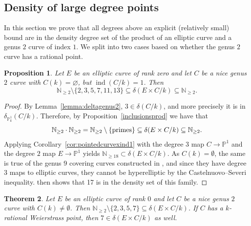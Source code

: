 \documentclass[a4paper,11pt]{amsart}
\theoremstyle{plain}
\newtheorem{thm}{Theorem}[section]
\newtheorem{prop}[thm]{Proposition}
\theoremstyle{remark}
\newcommand{\nn}{\mathbb{N}}
\newcommand{\pp}{\mathbb{P}}
\newcommand{\dendegs}{\delta}
\newcommand{\ind}{\operatorname{ind}}
\begin{document}
\subsection{Density of large degree points}

In this section we prove that all degrees above an explicit (relatively small) bound are in the density degree set of the product of an elliptic curve and a genus \(2\) curve of index \(1\).  We split into two cases based on whether the genus \(2\) curve has a rational point.

\begin{prop}\label{prop:index1genus2andE}
    Let $E$ be an elliptic curve of rank zero and let \(C\) be a nice genus \(2\) curve with $C(k)=\varnothing$, but $\ind(C/k)=1$. 
    Then
    \[
    \nn_{\geq 2}\setminus \{2,3,5,7,11,13\} \subseteq  \dendegs(E\times C/k)\subseteq \nn_{\geq 2}.
    \]
\end{prop}

\begin{proof}
By Lemma~\ref{lemma:deltagenus2}, $3\in \dendegs(C/k)$, and more precisely it is in $\delta_{\mathbb{P}^1_k}(C/k)$.
 Therefore, by Proposition~\ref{inclusionsprod} we have that
    \[
        \nn_{\geq 2} \cdot  \nn_{\geq 2} = \nn_{\geq 2} \setminus \{ \textup{primes} \} \subseteq \dendegs(E\times C/k)\subseteq \mathbb{N}_{\geq 2}.
    \]  
    Applying  Corollary~\ref{cor:pointedcurvexind1} with the degree \(3\) map \(C \to \pp^1\) and the degree \(2\) map \(E \to \pp^1\) yields $\nn_{\geq 18}\subset \dendegs(E\times C/k)$. 
    As $C(k) = \emptyset$, the same is true of the genus 9 covering curves constructed in , and since they have degree 3 maps to elliptic curves, they cannot be hyperelliptic by the Castelnuovo--Severi inequality.  then shows that 17 is in the density set of this family.
\end{proof}



\begin{thm}\label{thm:nngeq9indeltaCxE}
    Let \(E\) be an elliptic curve of rank \(0\) and let \(C\) be a nice genus \(2\) curve with \(C(k) \neq \emptyset\).
    Then $\nn_{\geq 2}\setminus \{2,3,5,7\} \subseteq \dendegs(E\times C/k)$.
    If \(C\) has a $k$-rational Weierstrass point, then $7\in \dendegs(E\times C/k)$ as well.
\end{thm}
\end{document}
